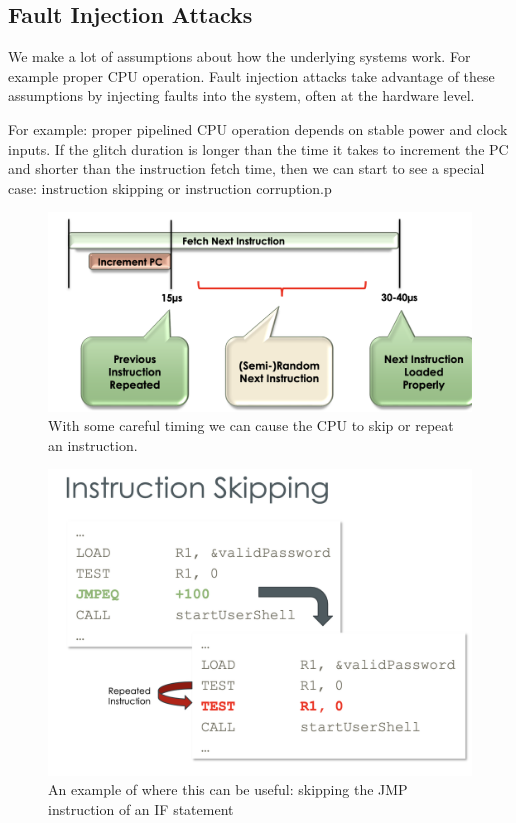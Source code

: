\documentclass[../notes.tex]{subfiles}
\begin{document}
\subsection{Fault Injection Attacks}

We make a lot of assumptions about how the underlying systems work. For example proper CPU operation.
Fault injection attacks take advantage of these assumptions by injecting faults into the system, often at the hardware level.

For example: proper pipelined CPU operation depends on stable power and clock inputs.
If the glitch duration is longer than the time it takes to increment the PC and shorter than the instruction fetch time, then we can start to see a special case: instruction skipping or instruction corruption.p


\begin{figure}[H]
    \centering
    \includegraphics[width=0.8\linewidth]{img/image_2023-01-23-19-40-51.png}
    \caption{With some careful timing we can cause the CPU to skip or repeat an instruction.}
\end{figure}

\begin{figure}[H]
    \centering
    \includegraphics[width=0.8\linewidth]{img/image_2023-01-23-19-41-31.png}
    \caption{An example of where this can be useful: skipping the JMP instruction of an IF statement}
\end{figure}
\end{document}
